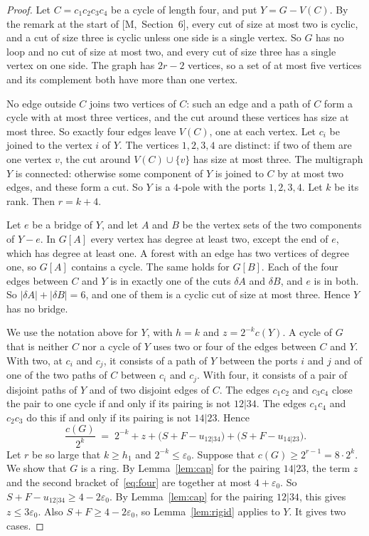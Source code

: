 \documentclass[11pt]{article}
\newcommand{\M}[1]{[M,~#1]}
\begin{document}
\begin{proof}
Let $C=c_1c_2c_3c_4$ be a cycle of length four, and put $Y=G-V(C)$. By the remark at the start
of \M{Section~6}, every cut of size at most two is cyclic, and a cut of size three is cyclic
unless one side is a single vertex. So $G$ has no loop and no cut of size at most two, and every
cut of size three has a single vertex on one side. The graph has $2r-2$ vertices, so a set of at
most five vertices and its complement both have more than one vertex.

 No edge outside $C$ joins two vertices of $C$:
such an edge and a path of $C$ form a cycle with at most three vertices, and the cut around
these vertices has size at most three. So exactly four edges leave $V(C)$, one at each vertex.
Let $c_i$ be joined to the vertex $i$ of $Y$. The vertices $1,2,3,4$ are distinct: if two of
them are one vertex $v$, the cut around $V(C)\cup\{v\}$ has size at most three. The multigraph
$Y$ is connected: otherwise some component of $Y$ is joined to $C$ by at most two edges, and
these form a cut. So $Y$ is a $4$-pole with the ports $1,2,3,4$. Let $k$ be its rank. Then
$r=k+4$.

Let $e$ be a bridge of $Y$, and let $A$ and $B$ be the vertex sets of the two components of
$Y-e$. In $G[A]$ every vertex has degree at least two, except the end of $e$, which has degree at
least one. A forest with an edge has two vertices of degree one, so $G[A]$ contains a cycle. The
same holds for $G[B]$. Each of the four edges between $C$ and $Y$ is in exactly one of the cuts
$\delta A$ and $\delta B$, and $e$ is in both. So $|\delta A|+|\delta B|=6$, and one of them is a
cyclic cut of size at most three. Hence $Y$ has no bridge.

 We use the notation above for $Y$, with $h=k$ and $z=2^{-k}c(Y)$. A cycle of
$G$ that is neither $C$ nor a cycle of $Y$ uses two or four of the edges between $C$ and $Y$.
With two, at $c_i$ and $c_j$, it consists of a path of $Y$ between the ports $i$ and $j$ and of
one of the two paths of $C$ between $c_i$ and $c_j$. With four, it consists of a pair of disjoint
paths of $Y$ and of two disjoint edges of $C$. The edges $c_1c_2$ and $c_3c_4$ close the pair to
one cycle if and only if its pairing is not $12|34$. The edges $c_1c_4$ and $c_2c_3$ do this if
and only if its pairing is not $14|23$. Hence
\begin{equation}\label{eq:four}
  \frac{c(G)}{2^{k}}\;=\;2^{-k}+z+\bigl(S+F-u_{12|34}\bigr)+\bigl(S+F-u_{14|23}\bigr).
\end{equation}
Let $r$ be so large that $k\ge h_1$ and $2^{-k}\le\varepsilon_0$. Suppose that
$c(G)\ge2^{r-1}=8\cdot2^{k}$. We show that $G$ is a ring. By Lemma~\ref{lem:cap} for the pairing
$14|23$, the term $z$ and the second bracket of~\eqref{eq:four} are together at most
$4+\varepsilon_0$. So $S+F-u_{12|34}\ge4-2\varepsilon_0$. By Lemma~\ref{lem:cap} for the pairing
$12|34$, this gives $z\le3\varepsilon_0$. Also $S+F\ge4-2\varepsilon_0$, so
Lemma~\ref{lem:rigid} applies to $Y$. It gives two cases.


\end{proof}
\end{document}
